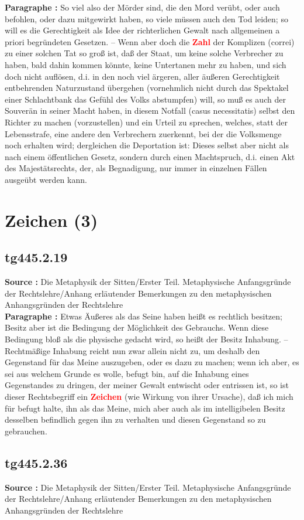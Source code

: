 \documentclass[a4paper,12pt,twoside]{book}
\newcommand{\match}[1]{\textcolor{red}{\textbf{#1}}}
\newcommand{\unnumberedsection}[1]{
	\section*{#1}
	\addcontentsline{toc}{section}{#1}
	\markright{#1}
}
\begin{document}
	\textbf{Paragraphe : }So viel also der Mörder sind, die den Mord verübt, oder auch befohlen, oder dazu mitgewirkt haben, so viele müssen auch den Tod leiden; so will es die Gerechtigkeit als Idee der richterlichen Gewalt nach allgemeinen a priori begründeten Gesetzen. – Wenn aber doch die \match{Zahl} der Komplizen (correi) zu einer solchen Tat so groß ist, daß der Staat, um keine solche Verbrecher zu haben, bald dahin kommen könnte, keine Untertanen mehr zu haben, und sich doch nicht auflösen, d.i. in den noch viel ärgeren, aller äußeren Gerechtigkeit entbehrenden Naturzustand übergehen (vornehmlich nicht durch das Spektakel einer Schlachtbank das Gefühl des Volks abstumpfen) will, so muß es auch der Souverän in seiner Macht haben, in diesem Notfall (casus necessitatis) selbst den Richter zu machen (vorzustellen) und ein Urteil zu sprechen, welches, statt der Lebensstrafe, eine andere den Verbrechern zuerkennt, bei der die Volksmenge noch erhalten wird; dergleichen die Deportation ist: Dieses selbst aber nicht als nach einem öffentlichen Gesetz, sondern durch einen Machtspruch, d.i. einen Akt des Majestätsrechts, der, als Begnadigung, nur immer in einzelnen Fällen ausgeübt werden kann. 
	
	\unnumberedsection{Zeichen (3)} 
	\subsection*{tg445.2.19} 
	\textbf{Source : }Die Metaphysik der Sitten/Erster Teil. Metaphysische Anfangsgründe der Rechtslehre/Anhang erläutender Bemerkungen zu den metaphysischen Anhangsgründen der Rechtslehre\\  
	
	\textbf{Paragraphe : }Etwas Äußeres als das Seine haben heißt es rechtlich besitzen; Besitz aber ist die Bedingung der Möglichkeit des Gebrauchs. Wenn diese Bedingung bloß als die physische gedacht wird, so heißt der Besitz Inhabung. – Rechtmäßige Inhabung reicht nun zwar allein nicht zu, um deshalb den Gegenstand für das Meine auszugeben, oder es dazu zu machen; wenn ich aber, es sei aus welchem Grunde es wolle, befugt bin, auf die Inhabung eines Gegenstandes zu dringen, der meiner Gewalt entwischt oder entrissen ist, so ist dieser Rechtsbegriff ein \match{Zeichen} (wie Wirkung von ihrer Ursache), daß ich mich für befugt halte, ihn als das Meine, mich aber auch als im intelligibelen Besitz desselben befindlich gegen ihn zu verhalten und diesen Gegenstand so zu gebrauchen. 
	
	\subsection*{tg445.2.36} 
	\textbf{Source : }Die Metaphysik der Sitten/Erster Teil. Metaphysische Anfangsgründe der Rechtslehre/Anhang erläutender Bemerkungen zu den metaphysischen Anhangsgründen der Rechtslehre\\  
	
\end{document}
